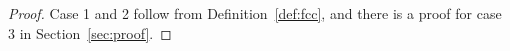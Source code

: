 \documentclass{article}
\begin{document}
\begin{proof}
  Case 1 and 2 follow from Definition~\ref{def:fcc}, and there is a proof for case 3 in Section~\ref{sec:proof}.



\end{proof}
\end{document}
